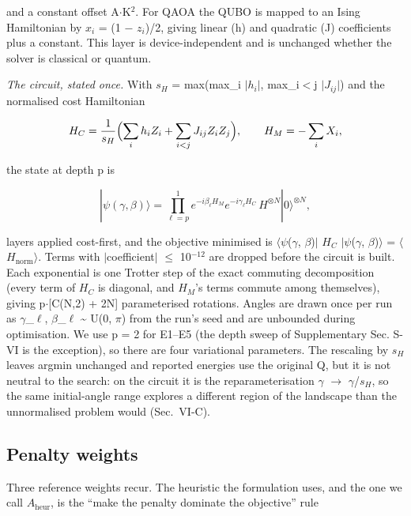 \documentclass{ieeeaccess}
\begin{document}
and a constant offset A$\cdot$K$^{2}$. For QAOA the QUBO is mapped to an Ising Hamiltonian by $x_{i}$ = (1 $-$ $z_{i}$)/2, giving linear (h) and quadratic (J) coefficients plus a constant. This layer is device-independent and is unchanged whether the solver is classical or quantum.


\textit{The circuit, stated once.} With $s_{H}$ = max(max\_i $|$$h_{i}$$|$, max\_{i$<$j} $|$$J_{ij}$$|$) and the normalised cost Hamiltonian


\begin{equation*}
H_C = \frac{1}{s_H}\Bigl(\sum_i h_i Z_i + \sum_{i<j} J_{ij} Z_i Z_j\Bigr),\qquad H_M = -\sum_i X_i,
\end{equation*}


the state at depth p is


\begin{equation*}
|\psi(\gamma,\beta)\rangle = \prod_{\ell=p}^{1} e^{-i\beta_\ell H_M} e^{-i\gamma_\ell H_C}\, H^{\otimes N}|0\rangle^{\otimes N},
\end{equation*}


layers applied cost-first, and the objective minimised is $\langle$$\psi$($\gamma$, $\beta$)$|$ $H_{C}$ $|$$\psi$($\gamma$, $\beta$)$\rangle$ = $\langle$$H_{\mathrm{norm}}$$\rangle$. Terms with $|$coefficient$|$ $\leq$ 10$^{-12}$ are dropped before the circuit is built. Each exponential is one Trotter step of the exact commuting decomposition (every term of $H_{C}$ is diagonal, and $H_{M}$'s terms commute among themselves), giving p$\cdot$[C(N,2) + 2N] parameterised rotations. Angles are drawn once per run as $\gamma$\_$\ell$, $\beta$\_$\ell$ \~{} U(0, $\pi$) from the run's seed and are unbounded during optimisation. We use p = 2 for E1--E5 (the depth sweep of Supplementary Sec. S-VI is the exception), so there are four variational parameters. The rescaling by $s_{H}$ leaves argmin unchanged and reported energies use the original Q, but it is not neutral to the search: on the circuit it is the reparameterisation $\gamma$ $\rightarrow$ $\gamma$/$s_{H}$, so the same initial-angle range explores a different region of the landscape than the unnormalised problem would (Sec.~VI-C).


\subsection{Penalty weights}


Three reference weights recur. The heuristic the formulation uses, and the one we call $A_{\mathrm{heur}}$, is the ``make the penalty dominate the objective'' rule
\end{document}
